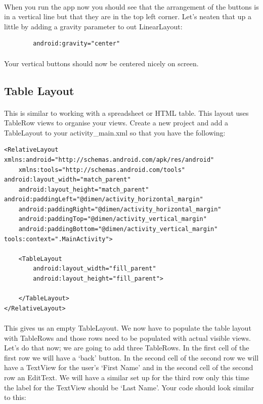 \documentclass[12pt, a4paper, twoside]{book}
\begin{document}
\paragraph{} When you run the app now you should see that the arrangement of the buttons is in a vertical line but that they are in the top left corner. Let's neaten that up a little by adding a gravity parameter to out LinearLayout:

\begin{lstlisting}
        android:gravity="center"
\end{lstlisting}

\paragraph{} Your vertical buttons should now be centered nicely on screen.

\subsection{Table Layout}
\paragraph{} This is similar to working with a spreadsheet or HTML table. This layout uses TableRow views to organise your views. Create a new project and add a TableLayout to your activity\_main.xml so that you have the following:

\begin{lstlisting}
<RelativeLayout xmlns:android="http://schemas.android.com/apk/res/android"
    xmlns:tools="http://schemas.android.com/tools" android:layout_width="match_parent"
    android:layout_height="match_parent" android:paddingLeft="@dimen/activity_horizontal_margin"
    android:paddingRight="@dimen/activity_horizontal_margin"
    android:paddingTop="@dimen/activity_vertical_margin"
    android:paddingBottom="@dimen/activity_vertical_margin" tools:context=".MainActivity">

    <TableLayout
        android:layout_width="fill_parent"
        android:layout_height="fill_parent">

    </TableLayout>
</RelativeLayout>
\end{lstlisting}

\paragraph{} This gives us an empty TableLayout. We now have to populate the table layout with TableRows and those rows need to be populated with actual visible views. Let's do that now; we are going to add three TableRows. In the first cell of the first row we will have a `back' button. In the second cell of the second row we will have a TextView for the user's `First Name' and in the second cell of the second row an EditText. We will have a similar set up for the third row only this time the label for the TextView should be `Last Name'. Your code should look similar to this:
\end{document}
